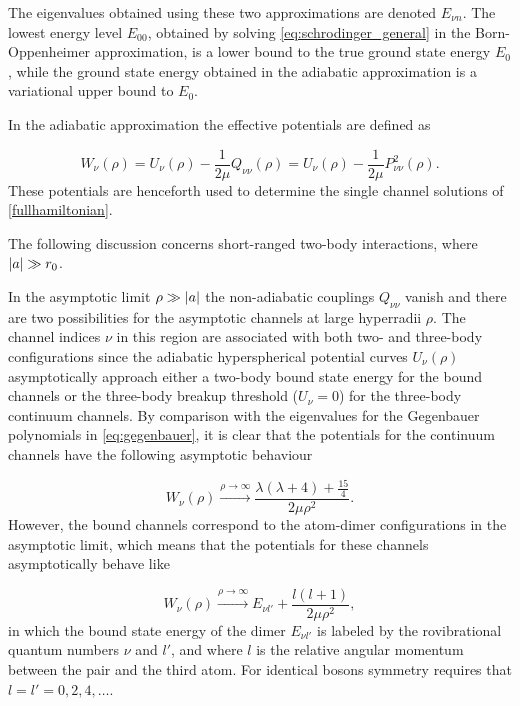 The eigenvalues obtained using these two approximations are denoted $E_{\nu n}$. The lowest energy level $E_{00}$, obtained by solving \eqref{eq:schrodinger_general} in the Born-Oppenheimer  approximation, is a lower bound to the true ground state energy $E_0$, while the ground state energy obtained in the adiabatic approximation is a variational upper bound to $E_{0}$. 

In the adiabatic approximation the effective potentials are defined as 

\begin{equation}
W_{\nu}(\rho) = U_{\nu}(\rho)-\frac{1}{2\mu}Q_{\nu \nu}(\rho) = U_{\nu}(\rho)-\frac{1}{2\mu}P_{\nu \nu}^2(\rho).
\end{equation} 
These potentials are henceforth used to determine the single channel solutions of \eqref{fullhamiltonian}. 

The following discussion concerns short-ranged two-body interactions, where $\lvert a\rvert\gg r_0$. 

In the asymptotic limit $\rho \gg \lvert a\rvert$ the non-adiabatic couplings $Q_{\nu \nu}$ vanish and there are two possibilities for the asymptotic channels at large hyperradii $\rho$. The channel indices $\nu$ in this region are associated with both two- and three-body configurations since the adiabatic hyperspherical potential curves $U_{\nu}(\rho)$ asymptotically approach either a two-body bound state energy for the bound channels or the three-body breakup threshold ($U_{\nu}=0$) for the three-body continuum channels.  By comparison with the eigenvalues for the Gegenbauer polynomials in \eqref{eq:gegenbauer}, it is clear that the potentials for the continuum channels have the following asymptotic behaviour 

\begin{equation}\label{eq:continuumchannel}
W_{\nu}(\rho)  \xrightarrow{ \rho \to \infty} \frac{\lambda(\lambda+4)+\frac{15}{4}}{2\mu \rho^2}.
\end{equation}
However, the bound channels correspond to the atom-dimer configurations in the asymptotic limit, which means that the potentials for these channels asymptotically behave like

\begin{equation}\label{eq:weakdimer}
W_{\nu}(\rho)  \xrightarrow{ \rho \to \infty} E_{\nu l'} +\frac{l(l+1)}{2\mu \rho^2},
\end{equation} 
in which the bound state energy of the dimer $E_{\nu l'}$ is labeled by the rovibrational quantum numbers $\nu$ and $l'$, and where $l$ is the relative angular momentum between the pair and the third atom. For identical bosons symmetry requires that $l=l'=0,2,4,\ldots$.

